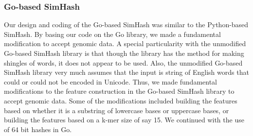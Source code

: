 \documentclass[12pt, letterpaper]{article}
\begin{document}
\subsubsection{Go-based SimHash}
Our design and coding of the Go-based SimHash was similar to the Python-based SimHash. By basing our code on the Go library, we made a fundamental modification to accept genomic data. A special particularity with the unmodified Go-based SimHash library is that though the library has the method for making shingles of words, it does not appear to be used. Also, the unmodified Go-based SimHash library very much assumes that the input is string of English words that could or could not be encoded in Unicode. Thus, we made fundamental modifications to the feature construction in the Go-based SimHash library to accept genomic data. Some of the modifications included building the features based on whether it is a substring of lowercase bases or uppercase bases, or building the features based on a k-mer size of say 15. We continued with the use of 64 bit hashes in Go.
\end{document}
